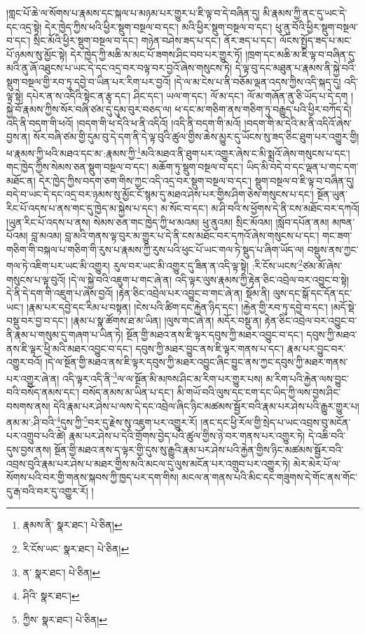 །གླང་པོ་ཆེ་ལ་སོགས་པ་རྣམས་དང་སྐལ་པ་མཉམ་པར་གྱུར་པ་ཇི་ལྟ་བ་དེ་བཞིན་དུ། མི་རྣམས་ཀྱི་ནང་དུ་ཡང་དེ་དང་འདྲ་སྟེ། དེར་ཁྱེད་ཀྱིས་ཕའི་ཕྱིར་སྡུག་བསྔལ་བ་དང་། མའི་ཕྱིར་སྡུག་བསྔལ་བ་དང་། ཕུ་ནུ་བོའི་ཕྱིར་སྡུག་བསྔལ་བ་དང་། སྲིང་མོའི་ཕྱིར་སྡུག་བསྔལ་བ་དང་། གཉེན་བཤེས་ཟད་པ་དང་། ནོར་ཟད་པ་དང་། ལོངས་སྤྱོད་ཟད་པ་མང་པོ་ཉམས་སུ་མྱོང་སྟེ། དེར་ཁྱེད་ཀྱི་མཆི་མ་མང་པོ་ཟགས་ཤིང་བབ་པར་གྱུར་ཏོ། །ཁྲག་དང་མཆི་མ་ཇི་ལྟ་བ་བཞིན་དུ་མའི་ནུ་ཞོ་འཐུངས་པ་ཡང་དེ་དང་འདྲ་བར་བལྟ་བར་བྱའོ་ཞེས་གསུངས་ཏེ། དེ་ལྟ་བུ་དང་མཐུན་པ་རྣམས་ནི་སྐྱེ་བའི་སྡུག་བསྔལ་གྱི་རབ་ཏུ་དབྱེ་བ་ཡིན་པར་རིག་པར་བྱའོ། །དེ་ལ་མ་ངེས་པ་ནི་བཅོམ་ལྡན་འདས་ཀྱིས་འདི་སྐད་དུ། འདི་ལྟ་སྟེ། དཔེར་ན་ས་འདིའི་སྟེང་ན་རྩྭ་དང་། ཤིང་དང་། ཡལ་ག་དང་། ལོ་མ་དང་། ལོ་མ་གཞོན་ནུ་ཅི་ཡོད་པ་དེ་དག །སྐྱེ་བོ་རྣམས་ཀྱིས་སོར་བཞི་ཙམ་དུ་དུམ་བུར་བཅད་ལ། ཕ་དང་མ་གཅིག་ནས་གཅིག་ཏུ་བརྒྱུད་པའི་ཕྱིར་བཀོད་དེ། འདི་ནི་བདག་གི་ཕའོ། །བདག་གི་ཕ་དེའི་ཕ་ནི་འདིའོ། །འདི་ནི་བདག་གི་མའོ། །བདག་གི་མ་དེའི་མ་ནི་འདིའོ་ཞེས་བྱས་ན། སོར་བཞི་ཙམ་གྱི་དུམ་བུ་དེ་དག་ནི་དེ་ལྟ་བུའི་ཚུལ་གྱིས་ཆེས་མྱུར་དུ་ཡོངས་སུ་ཟད་ཅིང་ཐུག་པར་འགྱུར་གྱི། ཕ་རྣམས་ཀྱི་ཕའི་མཐའ་དང་མ་:རྣམས་ཀྱི་\footnote{རྣམས་ནི་  སྣར་ཐང་།  པེ་ཅིན། }མའི་མཐའ་ནི་ཐུག་པར་འགྱུར་ཞེས་ང་མི་སྨྲའོ་ཞེས་གསུངས་པ་དང་། གང་ཁྱེད་ཀྱིས་སེམས་ཅན་སྡུག་བསྔལ་བ་དང་། མཆོག་ཏུ་སྡུག་བསྔལ་བ་དང་། ཡིད་མི་བདེ་བ་དང་ལྡན་པ་གང་དག་མཐོང་ན། དེར་ཁྱེད་ཀྱིས་བདག་ཅག་གིས་ཀྱང་འདི་འདྲ་བར་སྡུག་བསྔལ་བ་དང་། སྡུག་བསྔལ་བ་ཇི་ལྟ་བ་བཞིན་དུ། བདེ་བ་ཡང་དེ་དང་འདྲ་བར་ཉམས་སུ་མྱོང་ངོ་སྙམ་དུ་མཐའ་ཤེས་པར་གྱིས་ཤིག་ཅེས་གསུངས་པ་དང་། སྔོན་ཡུན་རིང་པོ་འདས་པ་ནས་གང་དུ་ཁྱེད་མ་སྐྱེས་པ་དང་། མ་སོང་བ་དང་། མ་ཤི་བའི་ས་ཕྱོགས་དེ་ནི་ངས་མཐོང་བར་དཀའོ། །ཡུན་རིང་པོ་འདས་པ་ནས། སེམས་ཅན་གང་ཁྱེད་ཀྱི་ཕ་མའམ། ཕུ་ནུའམ། སྲིང་མོའམ། །སློབ་དཔོན་ནམ། མཁན་པོའམ། བླ་མའམ། བླ་མའི་གནས་ལྟ་བུར་མ་གྱུར་པ་དེ་ནི་ངས་མཐོང་བར་དཀའོ་ཞེས་གསུངས་པ་དང་། གང་ཟག་གཅིག་གི་བསྐལ་པ་གཅིག་གི་རུས་པ་རྣམས་ཀྱི་རུས་པའི་ཕུང་པོ་ཡང་གལ་ཏེ་སྡུད་པ་ཞིག་ཡོད་ལ། བསྡུས་ནས་ཀྱང་གལ་ཏེ་འཇིག་པར་ཡང་མི་འགྱུར། རུལ་བར་ཡང་མི་འགྱུར་དུ་ཟིན་ན་འདི་ལྟ་སྟེ། :རི་ངོས་ཡངས་\footnote{རི་ངོས་ཡང་  སྣར་ཐང་།  པེ་ཅིན། }ཙམ་མོ་ཞེས་གསུངས་པ་ལྟ་བུའོ། །དེ་ལ་སྐྱེ་བའི་འཇུག་པ་གང་ཞེ་ན། འདི་ལྟར་ལུས་རྣམས་ཀྱི་རྟེན་ཅིང་འབྲེལ་བར་འབྱུང་བ་སྟེ། དེ་ནི་དེ་དག་གི་འཇུག་པ་ཞེས་བྱའོ། །རྟེན་ཅིང་འབྲེལ་པར་འབྱུང་བ་གང་ཞེ་ན། སྡོམ་ནི། ལུས་དང་སྒོ་དང་དོན་དང་ཡང་། །རྣམ་པར་དབྱེ་དང་རིམ་པ་བསྟན། །ངེས་པའི་ཚིག་དང་རྐྱེན་ཉིད་དང་། །རྐྱེན་གྱི་རབ་ཏུ་དབྱེ་བ་དང་། །མདོ་སྡེ་བསྡུ་བར་བྱ་བ་དང་། །རྣམ་པ་སྣ་ཚོགས་ཐ་མ་ཡིན། །ལུས་གང་ཞེ་ན། མདོར་བསྡུ་ན། རྟེན་ཅིང་འབྲེལ་བར་འབྱུང་བ་ནི་རྣམ་པ་གསུམ་དུ་གཞག་པ་ཡིན་ཏེ། སྔོན་གྱི་མཐའ་ནས་ཇི་ལྟར་དབུས་ཀྱི་མཐར་འབྱུང་བ་དང་། དབུས་ཀྱི་མཐའ་ནས་ཇི་ལྟར་ཕྱི་མའི་མཐར་འབྱུང་བ་དང་། དབུས་ཀྱི་མཐར་བྱུང་ནས་ཇི་ལྟར་གནས་པ་དང་། རྣམ་པར་བྱུང་བར་འགྱུར་བའོ། །དེ་ལ་སྔོན་གྱི་མཐའ་ནས་ཇི་ལྟར་དབུས་ཀྱི་མཐར་འབྱུང་ཞིང་བྱུང་ནས་ཀྱང་དབུས་ཀྱི་མཐར་གནས་པར་འགྱུར་ཞེ་ན། འདི་ལྟར་འདི་ནི་\footnote{ན་  སྣར་ཐང་།  པེ་ཅིན། }ལ་ལ་སྔོན་མི་མཁས་ཤིང་མ་རིག་པར་གྱུར་པས། མ་རིག་པའི་རྐྱེན་ལས་བྱུང་བའི་བསོད་ནམས་དང་། བསོད་ནམས་མ་ཡིན་པ་དང་། མི་གཡོ་བའི་ལུས་དང་ངག་དང་ཡིད་ཀྱི་ལས་བྱས་ཤིང་བསགས་ནས། དེའི་རྣམ་པར་ཤེས་པ་ལས་དེ་དང་འབྲེལ་ཞིང་ཉིང་མཚམས་སྦྱོར་བའི་རྣམ་པར་ཤེས་པའི་རྒྱུར་གྱུར་པ། ནམ་མ་:ཤི་བའི་\footnote{ཤིའི་  སྣར་ཐང་། }དུས་ཀྱི་\footnote{ཀྱིས་  སྣར་ཐང་།  པེ་ཅིན། }བར་དུ་རྗེས་སུ་འཇུག་པར་འགྱུར་རོ། །ནང་དང་ཕྱི་རོལ་གྱི་སྲེད་པ་ཡང་འབྲས་བུ་མངོན་པར་འགྲུབ་པའི་ཚེ། རྣམ་པར་ཤེས་པ་དེའི་གྲོགས་བྱེད་པའི་ཚུལ་གྱིས་ཉེ་བར་གནས་པར་འགྱུར་ཏེ། དེ་འཆི་བའི་དུས་བྱས་ནས། སྔོན་གྱི་མཐའ་ནས་ད་ལྟར་གྱི་དུས་སུ་རྒྱུའི་རྣམ་པར་ཤེས་པའི་རྐྱེན་གྱིས་ཉིང་མཚམས་སྦྱོར་བའི་འབྲས་བུའི་རྣམ་པར་ཤེས་པ་མཐར་གྱིས་མའི་མངལ་དུ་ལུས་མངོན་པར་འགྲུབ་པར་འགྱུར་ཏེ། མེར་མེར་པོ་ལ་སོགས་པའི་བར་གྱི་གནས་སྐབས་ཀྱི་ཁྱད་པར་དག་གིས། མངལ་ན་གནས་པའི་མིང་དང་གཟུགས་དེ་གོང་ནས་གོང་དུ་རྒ་བའི་བར་དུ་འགྱུར་རོ། །
